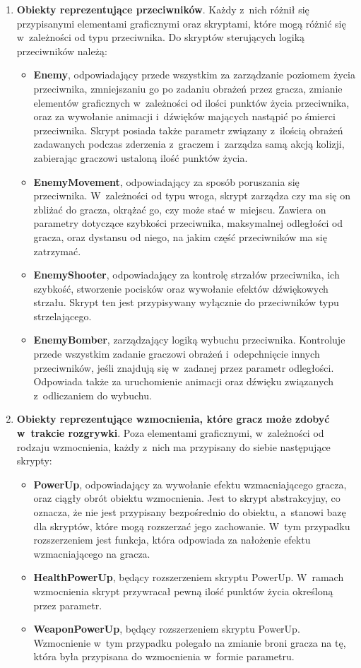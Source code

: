 \begin{enumerate}
	\item \textbf{Obiekty reprezentujące przeciwników}. Każdy z~nich różnił się przypisanymi elementami graficznymi oraz skryptami, które mogą różnić się w~zależności od typu przeciwnika. Do skryptów sterujących logiką przeciwników należą:
	\begin{itemize}
		\item \textbf{Enemy}, odpowiadający przede wszystkim za zarządzanie poziomem życia przeciwnika, zmniejszaniu go po zadaniu obrażeń przez gracza, zmianie elementów graficznych w~zależności od ilości punktów życia przeciwnika, oraz za wywołanie animacji i~dźwięków mających nastąpić po śmierci przeciwnika. Skrypt posiada także parametr związany z~ilością obrażeń zadawanych podczas zderzenia z~graczem i~zarządza samą akcją kolizji, zabierając graczowi ustaloną ilość punktów życia.
		\item \textbf{EnemyMovement}, odpowiadający za sposób poruszania się przeciwnika. W~zależności od typu wroga, skrypt zarządza czy ma się on zbliżać do gracza, okrążać go, czy może stać w~miejscu. Zawiera on parametry dotyczące szybkości przeciwnika, maksymalnej odległości od gracza, oraz dystansu od niego, na jakim część przeciwników ma się zatrzymać.
		\item \textbf{EnemyShooter}, odpowiadający za kontrolę strzałów przeciwnika, ich szybkość, stworzenie pocisków oraz wywołanie efektów dźwiękowych strzału. Skrypt ten jest przypisywany wyłącznie do przeciwników typu strzelającego.
		\item \textbf{EnemyBomber}, zarządzający logiką wybuchu przeciwnika. Kontroluje przede wszystkim zadanie graczowi obrażeń i~odepchnięcie innych przeciwników, jeśli znajdują się w~zadanej przez parametr odległości. Odpowiada także za uruchomienie animacji oraz dźwięku związanych z~odliczaniem do wybuchu.
	\end{itemize}
	
	\item \textbf{Obiekty reprezentujące wzmocnienia, które gracz może zdobyć w~trakcie rozgrywki}. Poza elementami graficznymi, w~zależności od rodzaju wzmocnienia, każdy z~nich ma przypisany do siebie następujące skrypty:
	\begin{itemize}
		\item \textbf{PowerUp}, odpowiadający za wywołanie efektu wzmacniającego gracza, oraz ciągły obrót obiektu wzmocnienia. Jest to skrypt abstrakcyjny, co oznacza, że nie jest przypisany bezpośrednio do obiektu, a~stanowi bazę dla skryptów, które mogą rozszerzać jego zachowanie. W~tym przypadku rozszerzeniem jest funkcja, która odpowiada za nałożenie efektu wzmacniającego na gracza.
		\item \textbf{HealthPowerUp}, będący rozszerzeniem skryptu PowerUp. W~ramach wzmocnienia skrypt przywracał pewną ilość punktów życia określoną przez parametr.
		\item \textbf{WeaponPowerUp}, będący rozszerzeniem skryptu PowerUp. Wzmocnienie w~tym przypadku polegało na zmianie broni gracza na tę, która była przypisana do wzmocnienia w~formie parametru.
	\end{itemize}
\end{enumerate}

